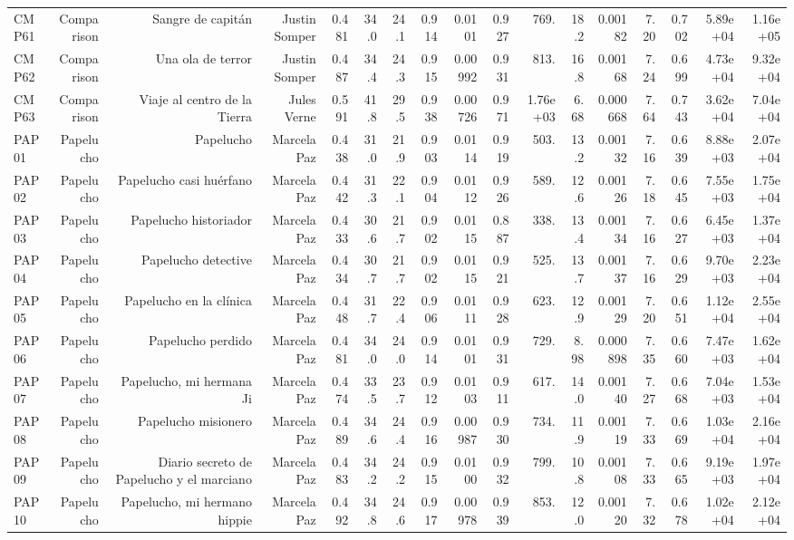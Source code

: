 \begin{table}[htbp]
\begin{tabular}{lrrrrrrrrrrrrrrrr}
CMP61 & Comparison & Sangre de capitán & Justin Somper & 0.481 & 34.0 & 24.1 & 0.914 & 0.0101 & 0.927 & 769. & 18.2 & 0.00182 & 7.20 & 0.702 & 5.89e+04 & 1.16e+05 \\
CMP62 & Comparison & Una ola de terror & Justin Somper & 0.487 & 34.4 & 24.3 & 0.915 & 0.00992 & 0.931 & 813. & 16.8 & 0.00168 & 7.24 & 0.699 & 4.73e+04 & 9.32e+04 \\
CMP63 & Comparison & Viaje al centro de la Tierra & Jules Verne & 0.591 & 41.8 & 29.5 & 0.938 & 0.00726 & 0.971 & 1.76e+03 & 6.68 & 0.000668 & 7.64 & 0.743 & 3.62e+04 & 7.04e+04 \\
PAP01 & Papelucho & Papelucho & Marcela Paz & 0.438 & 31.0 & 21.9 & 0.903 & 0.0114 & 0.919 & 503. & 13.2 & 0.00132 & 7.16 & 0.639 & 8.88e+03 & 2.07e+04 \\
PAP02 & Papelucho & Papelucho casi huérfano & Marcela Paz & 0.442 & 31.3 & 22.1 & 0.904 & 0.0112 & 0.926 & 589. & 12.6 & 0.00126 & 7.18 & 0.645 & 7.55e+03 & 1.75e+04 \\
PAP03 & Papelucho & Papelucho historiador & Marcela Paz & 0.433 & 30.6 & 21.7 & 0.902 & 0.0115 & 0.887 & 338. & 13.4 & 0.00134 & 7.16 & 0.627 & 6.45e+03 & 1.37e+04 \\
PAP04 & Papelucho & Papelucho detective & Marcela Paz & 0.434 & 30.7 & 21.7 & 0.902 & 0.0115 & 0.921 & 525. & 13.7 & 0.00137 & 7.16 & 0.629 & 9.70e+03 & 2.23e+04 \\
PAP05 & Papelucho & Papelucho en la clínica & Marcela Paz & 0.448 & 31.7 & 22.4 & 0.906 & 0.0111 & 0.928 & 623. & 12.9 & 0.00129 & 7.20 & 0.651 & 1.12e+04 & 2.55e+04 \\
PAP06 & Papelucho & Papelucho perdido & Marcela Paz & 0.481 & 34.0 & 24.0 & 0.914 & 0.0101 & 0.931 & 729. & 8.98 & 0.000898 & 7.35 & 0.660 & 7.47e+03 & 1.62e+04 \\
PAP07 & Papelucho & Papelucho, mi hermana Ji & Marcela Paz & 0.474 & 33.5 & 23.7 & 0.912 & 0.0103 & 0.911 & 617. & 14.0 & 0.00140 & 7.27 & 0.668 & 7.04e+03 & 1.53e+04 \\
PAP08 & Papelucho & Papelucho misionero & Marcela Paz & 0.489 & 34.6 & 24.4 & 0.916 & 0.00987 & 0.930 & 734. & 11.9 & 0.00119 & 7.33 & 0.669 & 1.03e+04 & 2.16e+04 \\
PAP09 & Papelucho & Diario secreto de Papelucho y el marciano & Marcela Paz & 0.483 & 34.2 & 24.2 & 0.915 & 0.0100 & 0.932 & 799. & 10.8 & 0.00108 & 7.33 & 0.665 & 9.19e+03 & 1.97e+04 \\
PAP10 & Papelucho & Papelucho, mi hermano hippie & Marcela Paz & 0.492 & 34.8 & 24.6 & 0.917 & 0.00978 & 0.939 & 853. & 12.0 & 0.00120 & 7.32 & 0.678 & 1.02e+04 & 2.12e+04 \\

\end{tabular}
\end{table}
